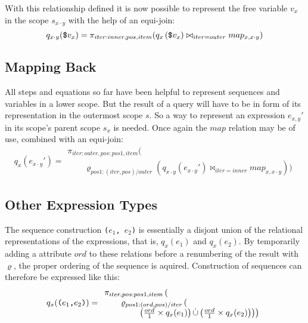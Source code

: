 With this relationship defined it is now possible to represent the free variable $v_{x}$ in the scope $s_{x \cdot
y}$ with the help of an equi-join:
\begin{equation}
q_{x \cdot y}(\mbox{\texttt{\$}}v_{x}) = \pi_{iter:inner, pos,
item}(q_{x}\left(\mbox{\texttt{\$}}v_{x})\bowtie_{iter=outer} map_{x, x \cdot y}\right)
\label{eq:ll:qxy_vx}
\end{equation}

\subsection{Mapping Back}
\label{sect:translation:ll:mappingBack}

All steps and equations so far have been helpful to represent sequences and variables in a lower scope. But the
result of a query will have to be in form of its representation in the outermost scope $s$. So a way to represent
an expression $e_{x,y}'$ in its scope's parent scope $s_{x}$ is needed. Once again the $map$ relation may be of
use, combined with an equi-join:
\begin{equation}
q_{x}(e_{x \cdot y}') =
\begin{array}{l}
 \pi_{iter:outer, pos:pos1, item}(\\ \qquad\varrho_{pos1:(iter,pos)/outer}(q_{x \cdot
y}(e_{x \cdot y}')\bowtie_{iter = inner}map_{x, x \cdot y}))
\end{array}
\label{eq:ll:qx_exymark}
\end{equation}


\subsection{Other Expression Types}
\label{sect:translation:ll:OtherExpr}

The sequence construction \texttt{(}$e_{1}$\texttt{, }$e_{2}$\texttt{)} is essentially a disjont union of the
relational representations of the expressions, that is, $q_{x}(e_{1})$ and $q_{x}(e_{2})$. By temporarily adding a
attribute $ord$ to these relations before a renumbering of the result with $\varrho$, the proper ordering of the
sequence is aquired. Construction of sequences can therefore be expressed like this:
\begin{equation}
q_{x}(\mbox{\texttt{(}}e_{1}\mbox{\texttt{,}}e_{2}\mbox{\texttt{)}})=
\begin{array}{l}


\pi_{iter,pos:pos1,item}
\left( \right.\\ \qquad

\varrho_{pos1:(ord,pos)/iter}
	\left( \right. \\ \qquad \qquad
	\left. \left.
		\left(
		\frac{ord}{1} \times q_{x}(e_{1})
		\right)
		\dot\cup
		\left(
		\frac{ord}{1} \times q_{x}(e_{2})
		\right)		
	\right)
\right)
\end{array}
\label{eq:ll:secuence}
\end{equation}

